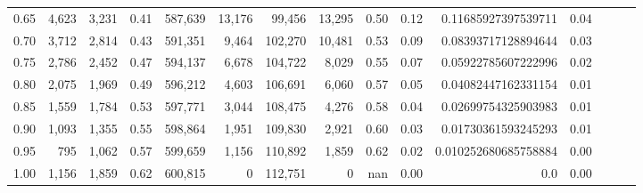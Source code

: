 \begin{tabular}{rrrrrrrrrrrrrrr}
0.65 &    4,623 &   3,231 &  0.41 &  587,639 &   13,176 &   99,456 &   13,295 &  0.50 &  0.12 &   0.11685927397539711 &      0.04 \\
0.70 &    3,712 &   2,814 &  0.43 &  591,351 &    9,464 &  102,270 &   10,481 &  0.53 &  0.09 &   0.08393717128894644 &      0.03 \\
0.75 &    2,786 &   2,452 &  0.47 &  594,137 &    6,678 &  104,722 &    8,029 &  0.55 &  0.07 &   0.05922785607222996 &      0.02 \\
0.80 &    2,075 &   1,969 &  0.49 &  596,212 &    4,603 &  106,691 &    6,060 &  0.57 &  0.05 &   0.04082447162331154 &      0.01 \\
0.85 &    1,559 &   1,784 &  0.53 &  597,771 &    3,044 &  108,475 &    4,276 &  0.58 &  0.04 &   0.02699754325903983 &      0.01 \\
0.90 &    1,093 &   1,355 &  0.55 &  598,864 &    1,951 &  109,830 &    2,921 &  0.60 &  0.03 &   0.01730361593245293 &      0.01 \\
0.95 &      795 &   1,062 &  0.57 &  599,659 &    1,156 &  110,892 &    1,859 &  0.62 &  0.02 &  0.010252680685758884 &      0.00 \\
1.00 &    1,156 &   1,859 &  0.62 &  600,815 &        0 &  112,751 &        0 &   nan &  0.00 &                   0.0 &      0.00 \\
\bottomrule
\end{tabular}
